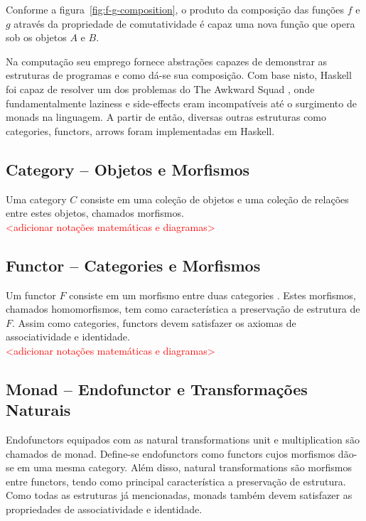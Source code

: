 \documentclass[10pt, conference]{IEEEtran}
\begin{document}
Conforme a figura~\ref{fig:f-g-composition}, o produto da composição das funções $f$ e $g$ através da propriedade de comutatividade é capaz uma nova função que opera sob os objetos $A$ e $B$.

Na computação seu emprego fornece abstrações capazes de demonstrar as estruturas de programas e como dá-se sua composição. Com base nisto, Haskell foi capaz de resolver um dos problemas do The Awkward Squad \cite{jones2001tacklingthe}, onde fundamentalmente laziness e side-effects eram incompatíveis até o surgimento de monads \cite{mogi1991monad} na linguagem. A partir de então, diversas outras estruturas como categories, functors, arrows foram implementadas em Haskell.

\subsection{Category -- Objetos e Morfismos}

Uma category $C$ consiste em uma coleção de objetos e uma coleção de relações entre estes objetos, chamados morfismos.\\

\textcolor{red}{<adicionar notações matemáticas e diagramas>}

\subsection{Functor -- Categories e Morfismos}

Um functor $F$ consiste em um morfismo entre duas categories \cite{maclane1971mat}. Estes morfismos, chamados homomorfismos, tem como característica a preservação de estrutura de $F$. Assim como categories, functors devem satisfazer os axiomas de associatividade e identidade.\\

\textcolor{red}{<adicionar notações matemáticas e diagramas>}

\subsection{Monad -- Endofunctor e Transformações Naturais}

Endofunctors equipados com as natural transformations unit e multiplication \cite{maclane1971mat} são chamados de monad. Define-se endofunctors como functors cujos morfismos dão-se em uma mesma category. Além disso, natural transformations são morfismos entre functors, tendo como principal característica a preservação de estrutura. Como todas as estruturas já mencionadas, monads também devem satisfazer as propriedades de associatividade e identidade.\\
\end{document}
